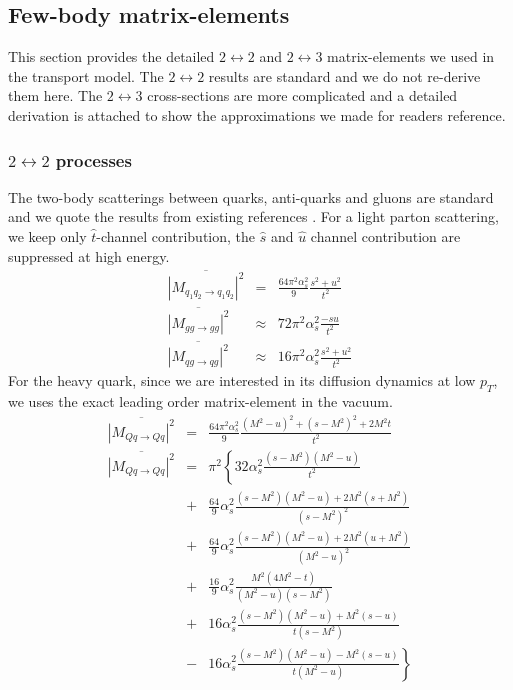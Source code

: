 \begin{appendices}
\chapter{Few-body matrix-elements}
\label{app:ME}
This section provides the detailed $2\leftrightarrow 2$ and $2\leftrightarrow 3$ matrix-elements we used in the transport model.
The $2\leftrightarrow 2$ results are standard and we do not re-derive them here.
The $2\leftrightarrow 3$ cross-sections are more complicated and a detailed derivation is attached to show the approximations we made for readers reference.  

\subsection{$2\leftrightarrow 2$ processes}
The two-body scatterings between quarks, anti-quarks and gluons are standard and we quote the results from existing references \cite{RevModPhys.59.465}.
For a light parton scattering, we keep only $\hat{t}$-channel contribution, the $\hat{s}$ and $\hat{u}$ channel contribution are suppressed at high energy.
\begin{eqnarray}
\overline{|M_{q_1q_2\rightarrow q_1q_2}|^2} &=& \frac{64\pi^2 \alpha_s^2}{9} \frac{s^2+u^2}{t^2} \\
\overline{|M_{gg\rightarrow gg}|^2} &\approx& 72\pi^2 \alpha_s^2 \frac{-su}{t^2}
 \\
\overline{|M_{qg\rightarrow qg}|^2} &\approx& 16\pi^2 \alpha_s^2 \frac{s^2+u^2}{t^2}
\end{eqnarray}
For the heavy quark, since we are interested in its diffusion dynamics at low $p_T$, we uses the exact leading order matrix-element in the vacuum.
\begin{eqnarray}
\overline{|M_{Qq\rightarrow Qq}|^2} &=& \frac{64\pi^2\alpha_s^2}{9} \frac{(M^2-u)^2 + (s-M^2)^2 + 2 M^2 t}{t^2}
\nonumber
\\
\overline{|M_{Qq\rightarrow Qq}|^2} &=& \pi^2 \left\{
32\alpha_s^2 \frac{(s-M^2)(M^2-u)}{t^2} \right.
\nonumber
\\
&+&\frac{64}{9}\alpha_s^2 \frac{(s-M^2)(M^2-u)+2M^2(s+M^2)}{(s-M^2)^2} \nonumber
\\
&+&\frac{64}{9}\alpha_s^2 \frac{(s-M^2)(M^2-u)+2M^2(u+M^2)}{(M^2-u)^2} \nonumber
\\
&+& \frac{16}{9}\alpha_s^2 \frac{M^2(4M^2 - t)}{(M^2-u)(s-M^2)} 
\nonumber
\\
&+& 16 \alpha_s^2 \frac{(s-M^2)(M^2-u)+M^2(s-u)}{t(s-M^2)}
\nonumber
\\
&-& \left. 16 \alpha_s^2 \frac{(s-M^2)(M^2-u)-M^2(s-u)}{t(M^2-u)}\right\}
\end{eqnarray}


\end{appendices}
